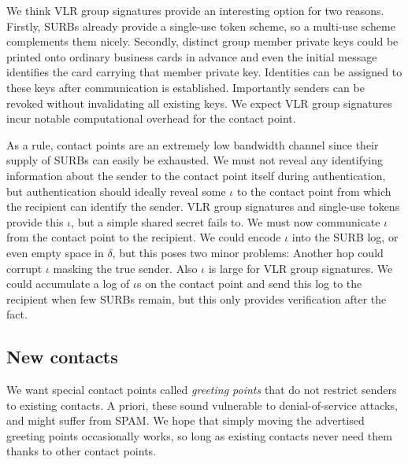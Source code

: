 We think VLR group signatures \cite{VLR} provide an interesting
option for two reasons.  Firstly, SURBs already provide a single-use
token scheme, so a multi-use scheme complements them nicely.  
Secondly, distinct group member private keys could be printed onto
ordinary business cards in advance and even the initial message
identifies the card carrying that member private key.  Identities
can be assigned to these keys after communication is established.  
Importantly senders can be revoked without invalidating all existing
keys.  We expect VLR group signatures incur notable computational
overhead for the contact point.  %

As a rule, contact points are an extremely low bandwidth channel
since their supply of SURBs can easily be exhausted.  We must not
reveal any identifying information about the sender to the contact 
point itself during authentication, but authentication should ideally
reveal some $\iota$ to the contact point from which the recipient
can identify the sender.  VLR group signatures and single-use tokens
provide this $\iota$, but a simple shared secret fails to.  We must
now communicate $\iota$ from the contact point to the recipient. 
We could encode $\iota$ into the SURB log, or even empty space in
$\delta$, but this poses two minor problems: 
 Another hop could corrupt $\iota$ masking the true sender.
 Also $\iota$ is large for VLR group signatures.  
We could accumulate a log of $\iota$s on the contact point and send
this log to the recipient when few SURBs remain, but this only
provides verification after the fact.



\subsection{New contacts}\label{subsec:greeting_points}


We want special contact points called {\em greeting points} that
do not restrict senders to existing contacts.  A priori, these sound
vulnerable to denial-of-service attacks, and might suffer from SPAM.
We hope that simply moving the advertised greeting points occasionally
works, so long as existing contacts never need them thanks to other
contact points.

